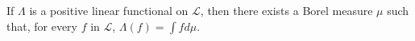 If $\Lambda$ is a positive linear functional on $\mathcal{L}$, then there exists a Borel measure $\mu$ such that, for every $f$ in $\mathcal{L}$, $\Lambda(f) = \int f d\mu$.
